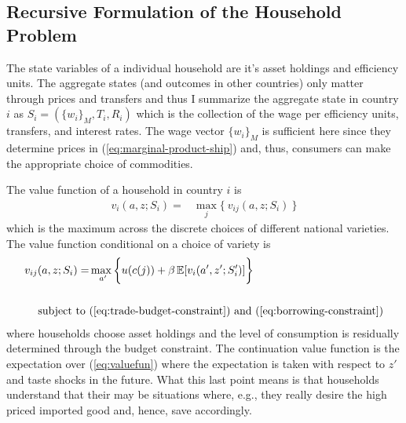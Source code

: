\documentclass[12pt,pdftex]{article}
\begin{document}
\begin{onehalfspacing}
\subsection{Recursive Formulation of the Household Problem}

The state variables of a individual household are it's asset holdings and efficiency units. The aggregate states (and outcomes in other countries) only matter through prices and transfers and thus I summarize the aggregate state in country $i$ as $S_i = (\{ w_i \}_{M}, T_i, R_{i})$ which is the collection of the wage per efficiency units, transfers, and interest rates. The wage vector $\{ w_i \}_{M}$ is sufficient here since they determine prices in (\ref{eq:marginal-product-ship}) and, thus, consumers can make the appropriate choice of commodities.

The value function of a household in country $i$ is
\begin{align}
v_{i}(a, z; S_i) = &  \max_{j} \big  \{ \  v_{ij}(a, z; S_i)  \ \big \}
\label{eq:valuefun}
\end{align}
which is the maximum across the discrete choices of different national varieties. The value function conditional on a choice of variety is
\begin{align}
v_{ij}(a, z;  S_i  ) = &  \max_{\ a' }\bigg  \{ u(c(j))  + \beta \, \mathbb{E} [v_{i}(a', z'; S_i' )]  \bigg\}
\label{eq:value_fun_option} \\
\nonumber \\
\mbox{subject to}  \ & (\ref{eq:trade-budget-constraint}) \  \mathrm{and} \ (\ref{eq:borrowing-constraint}) \nonumber
\end{align}
where households choose asset holdings and the level of consumption is residually determined through the budget constraint. The continuation value function is the expectation over (\ref{eq:valuefun}) where the expectation is taken with respect to $z'$ and taste shocks in the future. What this last point means is that households understand that their may be situations where, e.g., they really desire the high priced imported good and, hence, save accordingly.


\end{onehalfspacing}
\end{document}
